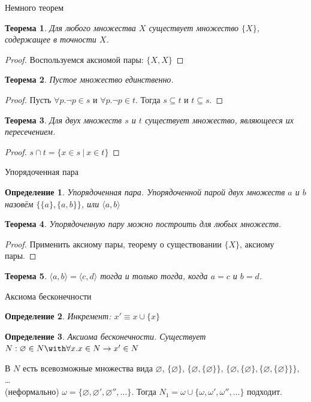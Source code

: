 \documentclass[aspectratio=169]{beamer}
\newtheorem{thm}{Теорема}[section]
\newtheorem{dfn}{Определение}[section]
\begin{document}
\begin{frame}{Немного теорем}
\begin{thm}Для любого множества $X$ существует множество $\{X\}$, содержащее в точности $X$.\end{thm}\pause
\begin{proof}Воспользуемся аксиомой пары: $\{X,X\}$\end{proof}\pause
\begin{thm}Пустое множество единственно.\end{thm}\pause
\begin{proof}Пусть $\forall p.\neg p \in s$ и $\forall p.\neg p \in t$.
Тогда $s \subseteq t$ и $t \subseteq s$.\end{proof}\pause
\begin{thm}Для двух множеств $s$ и $t$ существует множество, являющееся их пересечением.\end{thm}\pause
\begin{proof}$s \cap t = \{ x\in s\ |\ x \in t\}$\end{proof}
\end{frame}

\begin{frame}{Упорядоченная пара}
\begin{dfn}{Упорядоченная пара.}
Упорядоченной парой двух множеств $a$ и $b$ назовём
$\{\{a\},\{a,b\}\}$, или $\langle{}a,b\rangle$
\end{dfn}

\begin{thm}
Упорядоченную пару можно построить для любых множеств.
\end{thm}
\begin{proof}Применить аксиому пары, теорему о существовании $\{X\}$, аксиому пары.\end{proof}

\begin{thm}
$\langle{}a,b\rangle = \langle{}c,d\rangle$ тогда и только тогда,
когда $a = c$ и $b = d$.
\end{thm}
\end{frame}

\begin{frame}{Аксиома бесконечности}
\begin{dfn}Инкремент: $x' \equiv x \cup \{x\}$\end{dfn}\pause
\begin{dfn}Аксиома бесконечности. Существует $N: \varnothing \in N \with \forall x.x \in N\rightarrow x' \in N$\end{dfn}\pause

В $N$ есть всевозможные множества вида $\varnothing$\pause, $\{\varnothing\}$\pause, $\{\varnothing,\{\varnothing\}\}$, \pause
$\{\varnothing,\{\varnothing\},\{\varnothing,\{\varnothing\}\}\}$, \dots\pause
\\\vspace{0.5cm}
(неформально) $\omega = \{\varnothing, \varnothing', \varnothing'', \dots\}$. \pause
Тогда $N_1 = \omega\cup\{\omega,\omega',\omega'',\dots\}$ подходит.
\end{frame}
\end{document}
